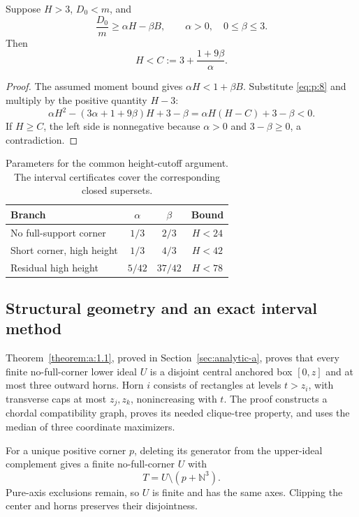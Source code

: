 \begin{lemma}\label{lemma:height-cutoff}
Suppose \(H>3\), \(D_0<m\), and
\[
\frac{D_0}{m}\ge\alpha H-\beta B,\qquad
\alpha>0,\quad 0\le\beta\le3.
\]
Then
\begin{equation}
\boxed{H<C:=3+\frac{1+9\beta}{\alpha}}.
\label{eq:height-cutoff}
\end{equation}
\end{lemma}
\begin{proof}
The assumed moment bound gives \(\alpha H<1+\beta B\).
Substitute \eqref{eq:p:8} and multiply by the positive quantity \(H-3\):
\[
\alpha H^2-(3\alpha+1+9\beta)H+3-\beta
=\alpha H(H-C)+3-\beta<0.
\]
If \(H\ge C\), the left side is nonnegative because \(\alpha>0\)
and \(3-\beta\ge0\), a contradiction.
\end{proof}

\begin{table}[htbp]
\centering
\begin{tabular}{@{}lccc@{}}
\toprule
Branch & \(\alpha\) & \(\beta\) & Bound \\
\midrule
No full-support corner & \(1/3\) & \(2/3\) & \(H<24\) \\
Short corner, high height & \(1/3\) & \(4/3\) & \(H<42\) \\
Residual high height & \(5/42\) & \(37/42\) & \(H<78\) \\
\bottomrule
\end{tabular}
\caption{Parameters for the common height-cutoff argument. The interval
certificates cover the corresponding closed supersets.}
\label{tab:height-cutoffs}
\end{table}

\subsection{Structural geometry and an exact interval method}\label{sec:p5}

Theorem~\ref{theorem:a:1.1}, proved in Section~\ref{sec:analytic-a},
proves that every finite no-full-corner lower ideal \(U\) is a disjoint
central anchored box \([0,z]\) and at most three outward horns.
Horn \(i\) consists of rectangles at levels \(t>z_i\), with transverse
caps at most \(z_j,z_k\), nonincreasing with \(t\).
The proof constructs a chordal compatibility graph, proves its needed
clique-tree property, and uses the median of three coordinate maximizers.

For a unique positive corner \(p\), deleting its generator from the
upper-ideal complement gives a finite no-full-corner \(U\) with
\begin{equation}
T=U\setminus(p+\mathbb N^3).
\label{eq:p:11}
\end{equation}
Pure-axis exclusions remain, so \(U\) is finite and has the same axes.
Clipping the center and horns preserves their disjointness.

